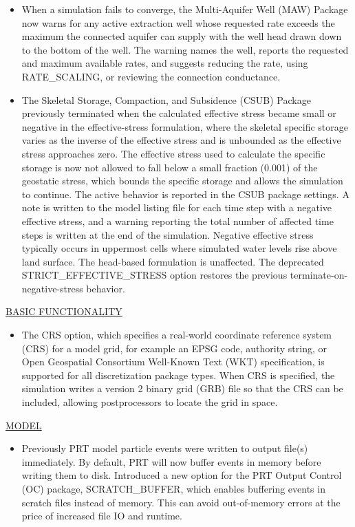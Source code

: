 \begin{itemize}
\item When a simulation fails to converge, the Multi-Aquifer Well (MAW) Package now warns for any active extraction well whose requested rate exceeds the maximum the connected aquifer can supply with the well head drawn down to the bottom of the well. The warning names the well, reports the requested and maximum available rates, and suggests reducing the rate, using RATE\_SCALING, or reviewing the connection conductance.
\item The Skeletal Storage, Compaction, and Subsidence (CSUB) Package previously terminated when the calculated effective stress became small or negative in the effective-stress formulation, where the skeletal specific storage varies as the inverse of the effective stress and is unbounded as the effective stress approaches zero. The effective stress used to calculate the specific storage is now not allowed to fall below a small fraction (0.001) of the geostatic stress, which bounds the specific storage and allows the simulation to continue. The active behavior is reported in the CSUB package settings. A note is written to the model listing file for each time step with a negative effective stress, and a warning reporting the total number of affected time steps is written at the end of the simulation. Negative effective stress typically occurs in uppermost cells where simulated water levels rise above land surface. The head-based formulation is unaffected. The deprecated STRICT\_EFFECTIVE\_STRESS option restores the previous terminate-on-negative-stress behavior.
\end{itemize}

\underline{BASIC FUNCTIONALITY}
\begin{itemize}
\item The CRS option, which specifies a real-world coordinate reference system (CRS) for a model grid, for example an EPSG code, authority string, or Open Geospatial Consortium Well-Known Text (WKT) specification, is supported for all discretization package types. When CRS is specified, the simulation writes a version 2 binary grid (GRB) file so that the CRS can be included, allowing postprocessors to locate the grid in space.
\end{itemize}

\underline{MODEL}
\begin{itemize}
\item Previously PRT model particle events were written to output file(s) immediately. By default, PRT will now buffer events in memory before writing them to disk. Introduced a new option for the PRT Output Control (OC) package, SCRATCH\_BUFFER, which enables buffering events in scratch files instead of memory. This can avoid out-of-memory errors at the price of increased file IO and runtime.
\end{itemize}

